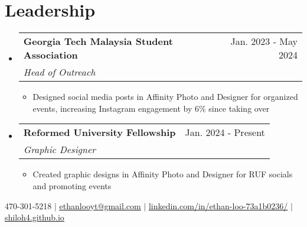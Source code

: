 \documentclass[letterpaper,11pt]{article}
\makeatletter
\newcommand{\resumeItem}[1]{
  \item\small{
    {#1 \vspace{-2pt}}
  }
}
\newcommand{\resumeSubheading}[4]{
  \vspace{-2pt}\item
    \begin{tabular*}{0.97\textwidth}[t]{l@{\extracolsep{\fill}}r}
      \textbf{#1} & #2 \\
      \textit{\small#3} & \textit{\small #4} \\
    \end{tabular*}\vspace{-7pt}
}
\newcommand{\resumeSubHeadingListStart}{\begin{itemize}[leftmargin=0.15in, label={}]}
\newcommand{\resumeSubHeadingListEnd}{\end{itemize}}
\newcommand{\resumeItemListStart}{\begin{itemize}}
\newcommand{\resumeItemListEnd}{\end{itemize}\vspace{-5pt}}
\makeatother
\begin{document}
\section{Leadership}
    \resumeSubHeadingListStart
      \resumeSubheading
      {Georgia Tech Malaysia Student Association}{Jan. 2023 - May 2024}
      {Head of Outreach}{}
      \resumeItemListStart
        \resumeItem{Designed social media posts in Affinity Photo and Designer for organized events, increasing Instagram engagement by 6\% since taking over}
      \resumeItemListEnd
    \resumeSubHeadingListEnd

    \resumeSubHeadingListStart
      \resumeSubheading
      {Reformed University Fellowship}{Jan. 2024 - Present}
      {Graphic Designer}{}
      \resumeItemListStart
        \resumeItem{Created graphic designs in Affinity Photo and Designer for RUF socials and promoting events}
      \resumeItemListEnd
    \resumeSubHeadingListEnd

\begin{center}
    
\small 470-301-5218 $|$
\href{mailto:ethanlooyt@gmail.com}{\underline{ethanlooyt@gmail.com}} $|$
\href{https://www.linkedin.com/in/ethan-loo-73a1b0236/}{\underline{linkedin.com/in/ethan-loo-73a1b0236/}} $|$
\href{https://shiloh4.github.io/}{\underline{shiloh4.github.io}}
\end{center}
\end{document}
